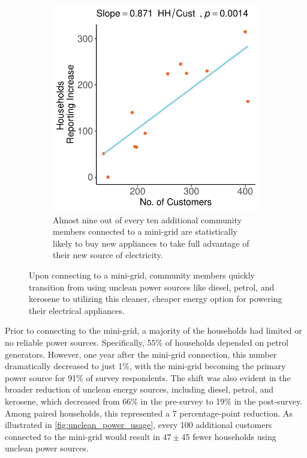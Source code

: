 \begin{figure}[th]
\begin{subfigure}[t]{0.48\textwidth}
		\centering
		\includegraphics[width=\textwidth]{images/appliances_count_regression_community.pdf}
		\caption{Almost nine out of every ten additional community members connected to a mini-grid are statistically likely to buy new appliances to take full advantage of their new source of electricity.}
		\label{fig:appliances}
	\end{subfigure}
	\caption{Upon connecting to a mini-grid, community members quickly transition from using unclean power sources like diesel, petrol, and kerosene to utilizing this cleaner, cheaper energy option for powering their electrical appliances.}
	\label{fig:appliances-and-unclean-power}
\end{figure}

Prior to connecting to the mini-grid, a majority of the households had limited or no reliable power sources. Specifically, 55\% of households depended on petrol generators. However, one year after the mini-grid connection, this number dramatically decreased to just 1\%, with the mini-grid becoming the primary power source for 91\% of survey respondents. The shift was also evident in the broader reduction of unclean energy sources, including diesel, petrol, and kerosene, which decreased from 66\% in the pre-survey to 19\% in the post-survey. Among paired households, this represented a 7 percentage-point reduction. As illustrated in \cref{fig:unclean_power_usage}, every 100 additional customers connected to the mini-grid would result in $47\pm45$ fewer households using unclean power sources.

